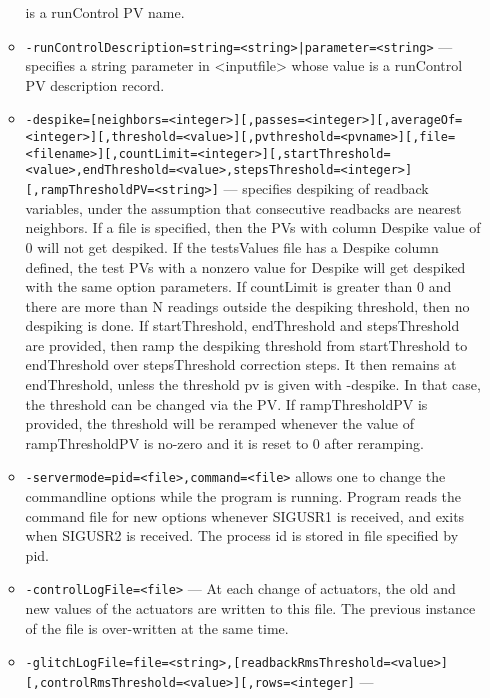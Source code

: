\begin{itemize}
\begin{itemize}
               is a runControl PV name.
        \item {\tt -runControlDescription=string=<string>|parameter=<string>} ---
               specifies a string parameter in <inputfile> whose value
               is a runControl PV description record.
        \item {\tt -despike=[neighbors=<integer>][,passes=<integer>][,averageOf=<integer>][,threshold=<value>][,pvthreshold=<pvname>][,file=<filename>][,countLimit=<integer>][,startThreshold=<value>,endThreshold=<value>,stepsThreshold=<integer>][,rampThresholdPV=<string>]} ---
                specifies despiking of readback variables,
               under the assumption
               that consecutive readbacks are nearest neighbors. If a file is
               specified, then the PVs with column Despike value of 0 will not
               get despiked. If the testsValues file has a Despike column defined,
               the test PVs with a nonzero value for Despike will get despiked
               with the same option parameters. If countLimit is greater than 0
               and there are more than N readings outside the despiking threshold,
               then no despiking is done.
               If startThreshold, endThreshold and stepsThreshold 
               are provided, then ramp the despiking threshold from startThreshold to 
               endThreshold over stepsThreshold correction steps. It then remains at 
               endThreshold, unless the threshold pv is given with -despike.  
               In that case, the threshold can be changed via the PV.
               If rampThresholdPV is provided, the threshold will be reramped whenever 
               the value of rampThresholdPV is no-zero and it is reset to 0 after reramping.
        \item {\tt -servermode=pid=<file>,command=<file>}     allows one to change the commandline options while the program is
               running. Program reads the command file for new options whenever
               SIGUSR1 is received, and exits when SIGUSR2 is received.
               The process id is stored in file specified by pid.
        \item {\tt -controlLogFile=<file>} --- At each change of actuators, the old and new values of the actuators
               are written to this file. The previous instance of the file 
               is over-written at the same time.
        \item {\tt -glitchLogFile=file=<string>,[readbackRmsThreshold=<value>][,controlRmsThreshold=<value>][,rows=<integer]} ---

\end{itemize}
\end{itemize}
